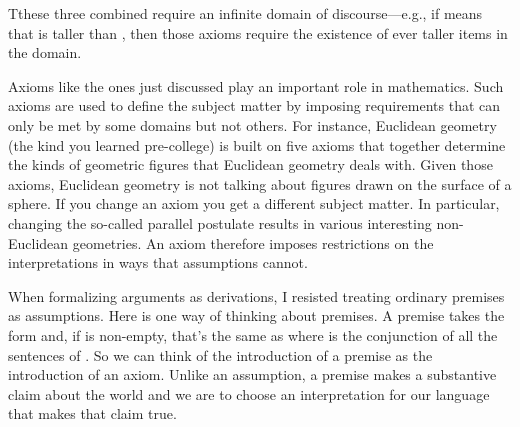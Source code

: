 Tthese three combined require an infinite domain of discourse---e.g., if  
means that  is taller than , then those axioms require the existence 
of ever taller items in the domain. 

Axioms like the ones just discussed play an important role in mathematics.  Such 
axioms are used to define the subject matter by imposing requirements that can 
only be met by some domains but not others.  For instance,
Euclidean geometry (the kind you learned pre-college) is built on five axioms 
that together determine the kinds of geometric figures that Euclidean geometry 
deals with. Given those axioms, Euclidean geometry is not talking about figures 
drawn on the surface of a sphere. If you change an axiom you get a different 
subject matter. In particular, changing the so-called parallel postulate results 
in various interesting non-Euclidean geometries.
An axiom therefore imposes restrictions on the interpretations in ways that 
assumptions cannot.

When formalizing arguments as derivations, I resisted treating ordinary premises 
as assumptions. Here is one way of thinking about premises. A premise takes the 
form  and, if \p{\Gamma} is non-empty, that's the same as 
 where \p{\widehat{\Gamma}} is the 
conjunction of all the sentences of \p{\Gamma}. So we can think of the 
introduction of a premise as the introduction of an axiom. Unlike an assumption, 
a premise makes a substantive claim about the world and we are to choose an 
interpretation for our language that makes that claim true.

















